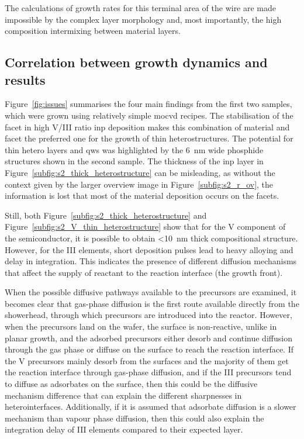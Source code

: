 The calculations of growth rates for this terminal area of the wire are made impossible by the complex layer morphology and, most importantly, the high composition intermixing between material layers.

\subsection{Correlation between growth dynamics and results}
Figure~\ref{fig:issues} summarises the four main findings from the first two samples, which were grown using relatively simple \acs{mocvd} recipes. The stabilisation of the  facet in high V/III ratio \acs{inp} deposition makes this combination of material and facet the preferred one for the growth of thin heterostructures. The potential for thin hetero layers and \acl{qw}s was highlighted by the \qty{6}{\nano\metre} wide phosphide structures shown in the second sample. The thickness of the \acs{inp} layer in Figure~\ref{subfig:s2_thick_heterostructure} can be misleading, as without the context given by the larger overview image in Figure~\ref{subfig:s2_r_ov}, the information is lost that most of the material deposition occurs on the  facets. 
\par
Still, both Figure~\ref{subfig:s2_thick_heterostructure} and Figure~\ref{subfig:s2_V_thin_heterostructure} show that for the V component of the semiconductor, it is possible to obtain <\qty{10}{\nano\metre} thick compositional structure. However, for the III elements, short deposition pulses lead to heavy alloying and delay in integration. This indicates the presence of different diffusion mechanisms that affect the supply of reactant to the reaction interface (the growth front). 

When the possible diffusive pathways available to the precursors are examined, it becomes clear that gas-phase diffusion is the first route available directly from the showerhead, through which precursors are introduced into the reactor. However, when the precursors land on the wafer, the surface is non-reactive, unlike in planar growth, and the adsorbed precursors either desorb and continue diffusion through the gas phase or diffuse on the surface to reach the reaction interface. If the V precursors mainly desorb from the surfaces and the majority of them get the reaction interface through gas-phase diffusion, and if the III precursors tend to diffuse as adsorbates on the surface, then this could be the diffusive mechanism difference that can explain the different sharpnesses in heterointerfaces. Additionally, if it is assumed that adsorbate diffusion is a slower mechanism than vapour phase diffusion, then this could also explain the integration delay of III elements compared to their expected layer. 

